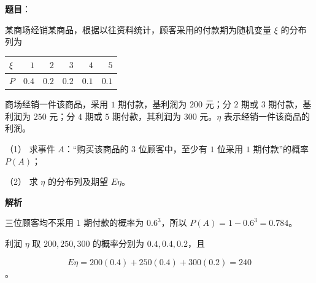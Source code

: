 \begin{answer}

\textbf{题目}：

某商场经销某商品，根据以往资料统计，顾客采用的付款期为随机变量 $\xi$ 的分布列为

\begin{center}
\begin{tabular}{lrrrrr}
\toprule
$\xi$ & $1$ & $2$ & $3$ & $4$ & $5$ \\
\midrule
$P$ & $0.4$ & $0.2$ & $0.2$ & $0.1$ & $0.1$ \\
\bottomrule
\end{tabular}
\end{center}

商场经销一件该商品，采用 $1$ 期付款，基利润为 $200$ 元；分 $2$ 期或 $3$ 期付款，基利润为 $250$ 元；分 $4$ 期或 $5$ 期付款，其利润为 $300$ 元。$\eta$ 表示经销一件该商品的利润。

（1） 求事件 $A$：“购买该商品的 $3$ 位顾客中，至少有 $1$ 位采用 $1$ 期付款”的概率 $P(A)$；

（2） 求 $\eta$ 的分布列及期望 $E\eta$。

\textbf{解析}


三位顾客均不采用 $1$ 期付款的概率为 $0.6^3$，所以 $P(A)=1-0.6^3=0.784$。


利润 $\eta$ 取 $200,250,300$ 的概率分别为 $0.4,0.4,0.2$，且

\nopagebreak[4]
\[
E\eta=200(0.4)+250(0.4)+300(0.2)=240
\]
。



\end{answer}
